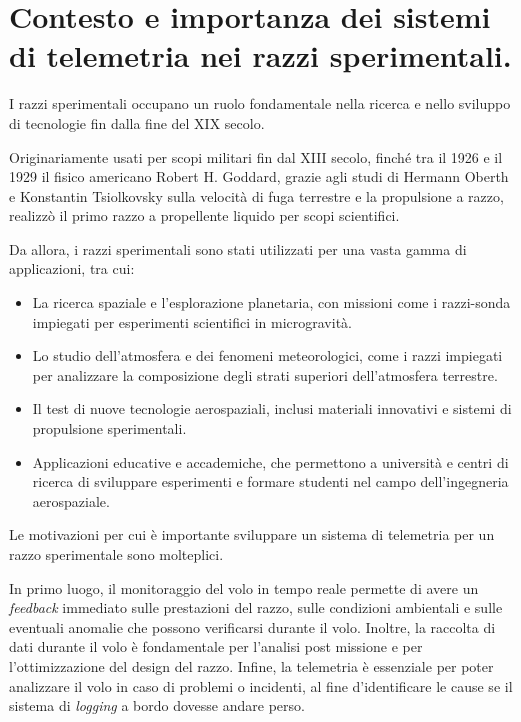 \documentclass[12pt,a4paper,twoside]{book}
\begin{document}
\section{Contesto e importanza dei sistemi di telemetria nei razzi sperimentali.}
I razzi sperimentali occupano un ruolo fondamentale nella ricerca e nello 
sviluppo di tecnologie fin dalla fine del XIX secolo.

Originariamente usati per scopi militari fin dal XIII secolo, finch\'e tra il 
1926 e il 1929 il fisico americano Robert H. Goddard, grazie agli studi di 
Hermann Oberth e Konstantin Tsiolkovsky sulla velocità di fuga terrestre e la 
propulsione a razzo, realizz\`o il primo razzo a propellente liquido per scopi 
scientifici\cite{seibert2006history}.

Da allora, i razzi sperimentali sono stati utilizzati per una vasta gamma di 
applicazioni, tra cui:
\begin{itemize}
    \item La ricerca spaziale e l’esplorazione planetaria, con missioni come 
    i razzi-sonda impiegati per esperimenti scientifici in microgravità.
    \item Lo studio dell’atmosfera e dei fenomeni meteorologici, come i razzi 
    impiegati per analizzare la composizione degli strati superiori 
    dell’atmosfera terrestre.
    \item Il test di nuove tecnologie aerospaziali, inclusi materiali innovativi
     e sistemi di propulsione sperimentali.
    \item Applicazioni educative e accademiche, che permettono a università e 
    centri di ricerca di sviluppare esperimenti e formare studenti nel campo 
    dell’ingegneria aerospaziale.
\end{itemize}

Le motivazioni per cui \`e importante sviluppare un sistema di telemetria per un 
razzo sperimentale sono molteplici.

In primo luogo, il monitoraggio del volo in tempo reale permette di avere un 
\emph{feedback} immediato sulle prestazioni del razzo, sulle condizioni 
ambientali e sulle eventuali anomalie che possono verificarsi durante il volo.
Inoltre, la raccolta di dati durante il volo \`e fondamentale per l’analisi 
post missione e per l’ottimizzazione del design del razzo.
Infine, la telemetria \`e essenziale per poter analizzare il volo in caso di 
problemi o incidenti, al fine d'identificare le cause se il sistema di 
\emph{logging} a bordo dovesse andare perso.
\end{document}
